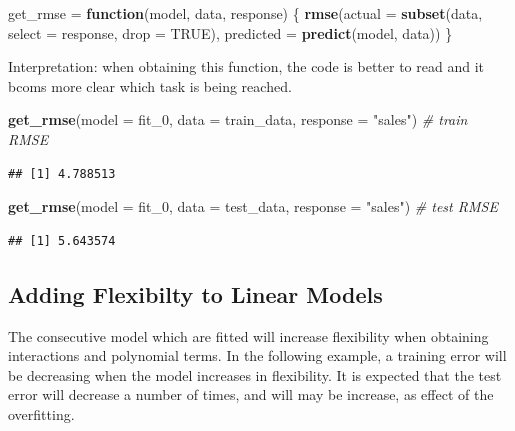\documentclass[]{report}
\newenvironment{Shaded}{\begin{snugshade}}{\end{snugshade}}
\newcommand{\KeywordTok}[1]{\textcolor[rgb]{0.13,0.29,0.53}{\textbf{#1}}}
\newcommand{\DataTypeTok}[1]{\textcolor[rgb]{0.13,0.29,0.53}{#1}}
\newcommand{\DecValTok}[1]{\textcolor[rgb]{0.00,0.00,0.81}{#1}}
\newcommand{\StringTok}[1]{\textcolor[rgb]{0.31,0.60,0.02}{#1}}
\newcommand{\CommentTok}[1]{\textcolor[rgb]{0.56,0.35,0.01}{\textit{#1}}}
\newcommand{\OtherTok}[1]{\textcolor[rgb]{0.56,0.35,0.01}{#1}}
\newcommand{\ControlFlowTok}[1]{\textcolor[rgb]{0.13,0.29,0.53}{\textbf{#1}}}
\newcommand{\NormalTok}[1]{#1}
\begin{document}
\begin{Shaded}
\begin{Highlighting}[]
\NormalTok{get_rmse =}\StringTok{ }\ControlFlowTok{function}\NormalTok{(model, data, response) \{}
  \KeywordTok{rmse}\NormalTok{(}\DataTypeTok{actual =} \KeywordTok{subset}\NormalTok{(data, }\DataTypeTok{select =}\NormalTok{ response, }\DataTypeTok{drop =} \OtherTok{TRUE}\NormalTok{),}
       \DataTypeTok{predicted =} \KeywordTok{predict}\NormalTok{(model, data))}
\NormalTok{\}}
\end{Highlighting}
\end{Shaded}

Interpretation: when obtaining this function, the code is better to read
and it bcoms more clear which task is being reached.

\begin{Shaded}
\begin{Highlighting}[]
\KeywordTok{get_rmse}\NormalTok{(}\DataTypeTok{model =}\NormalTok{ fit_}\DecValTok{0}\NormalTok{, }\DataTypeTok{data =}\NormalTok{ train_data, }\DataTypeTok{response =} \StringTok{"sales"}\NormalTok{) }\CommentTok{# train RMSE}
\end{Highlighting}
\end{Shaded}

\begin{verbatim}
## [1] 4.788513
\end{verbatim}

\begin{Shaded}
\begin{Highlighting}[]
\KeywordTok{get_rmse}\NormalTok{(}\DataTypeTok{model =}\NormalTok{ fit_}\DecValTok{0}\NormalTok{, }\DataTypeTok{data =}\NormalTok{ test_data, }\DataTypeTok{response =} \StringTok{"sales"}\NormalTok{) }\CommentTok{# test RMSE}
\end{Highlighting}
\end{Shaded}

\begin{verbatim}
## [1] 5.643574
\end{verbatim}

\subsection{Adding Flexibilty to Linear
Models}\label{adding-flexibilty-to-linear-models}

The consecutive model which are fitted will increase flexibility when
obtaining interactions and polynomial terms. In the following example, a
training error will be decreasing when the model increases in
flexibility. It is expected that the test error will decrease a number
of times, and will may be increase, as effect of the overfitting.
\end{document}
